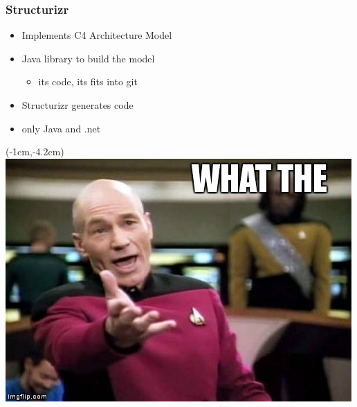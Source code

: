 \documentclass[xelatex,13pt]{beamer}
\begin{document}
\begin{frame}
	\frametitle{Structurizr}
	\begin{itemize}
		\item Implements C4 Architecture Model 
		\item Java library to build the model
			\pause
		\begin{itemize}
			\item its code, its fits into git
		\end{itemize}
			\pause
		\item Structurizr generates code
			\pause
		\item {\huge only Java and .net}
	\end{itemize}
\end{frame}
\begin{frame}[plain]
\begin{textblock*}{0cm}(-1cm,-4.2cm)
	\includegraphics[width=1.0\paperwidth]{picardwtf.jpg}
\end{textblock*}
\end{frame}
\end{document}
